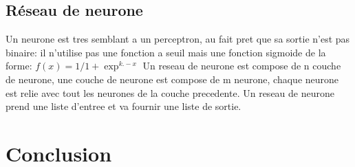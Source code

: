 \documentclass{article}
\begin{document}
\subsection{Réseau de neurone}
Un neurone est tres semblant a un perceptron, au fait pret que sa sortie n'est pas binaire: il n'utilise pas une fonction a seuil mais une fonction sigmoide de la forme: 
$f(x) = 1 / 1 + \exp ^{k.-x}$
Un reseau de neurone est compose de n couche de neurone, une couche de neurone est compose de m neurone, chaque neurone est relie avec tout les neurones de la couche precedente. Un reseau de neurone prend une liste d'entree et va fournir une liste de sortie.

\section{Conclusion}
\end{document}
